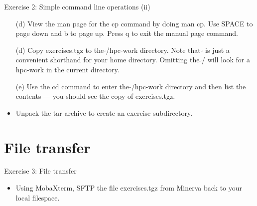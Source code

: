 \documentclass{beamer}
\begin{document}
\begin{frame}{Exercise 2: Simple command line operations (ii)}
  \begin{itemize}
    
\item[(d)]{View the man page for the \alert{cp} command by doing \alert{man cp}. Use \alert{SPACE} to page down and \alert{b} to page up. Press \alert{q} to exit the manual page command.}

\item[(d)]{Copy \alert{exercises.tgz} to the $\tilde{}$/hpc-work directory. Note that $\tilde{}$ is just a convenient shorthand for your home directory. Omitting the $\tilde{}$/ will look for a hpc-work in the current directory.}

\item[(e)]{Use the \alert{cd} command to enter the $\tilde{}$/hpc-work directory and then list the contents --- you should see the copy of exercises.tgz.}

\item{Unpack the tar archive to create an exercise subdirectory.}
\end{itemize}
\end{frame}

\section{File transfer}
\begin{frame}{Exercise 3: File transfer}
\begin{itemize}
\item{Using MobaXterm, SFTP the file \alert{exercises.tgz} from Minerva back to your local filespace.}
\end{itemize}
\end{frame}
\end{document}
